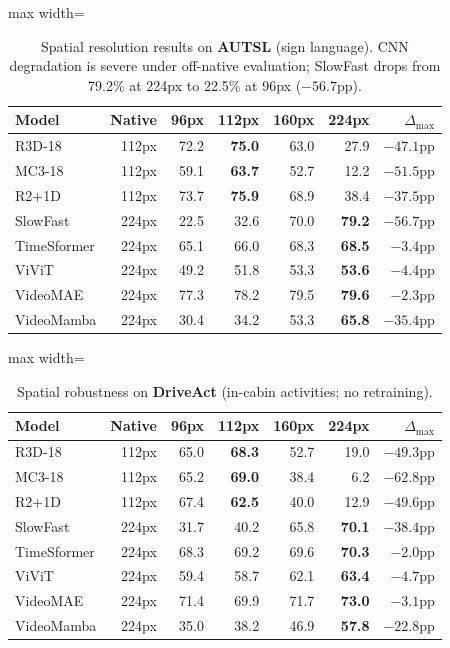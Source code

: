 \documentclass[a4paper, 10pt, conference, onecolumn]{ieeeconf}
\newcommand{\tabtight}{\setlength{\tabcolsep}{3.5pt}\renewcommand{\arraystretch}{1.12}}
\begin{document}
\begin{table}[!htbp]
\centering
\caption{Spatial resolution results on \textbf{AUTSL} (sign language). CNN degradation is severe under off-native evaluation; SlowFast drops from 79.2\% at 224px to 22.5\% at 96px ($-56.7$pp).}
\label{tab:sup_sp_autsl}
\scriptsize\tabtight
\begin{adjustbox}{max width=\textwidth}
\begin{tabular}{l r rrrr r}
\toprule
Model & Native & 96px & 112px & 160px & 224px & $\Delta_\text{max}$ \\
\midrule
R3D-18      & 112px & 72.2 & \textbf{75.0} & 63.0 & 27.9 & $-47.1$pp \\
MC3-18      & 112px & 59.1 & \textbf{63.7} & 52.7 & 12.2 & $-51.5$pp \\
R2+1D       & 112px & 73.7 & \textbf{75.9} & 68.9 & 38.4 & $-37.5$pp \\
SlowFast    & 224px & 22.5 & 32.6 & 70.0 & \textbf{79.2} & $-56.7$pp \\
\midrule
TimeSformer & 224px & 65.1 & 66.0 & 68.3 & \textbf{68.5} & $-3.4$pp \\
ViViT       & 224px & 49.2 & 51.8 & 53.3 & \textbf{53.6} & $-4.4$pp \\
VideoMAE    & 224px & 77.3 & 78.2 & 79.5 & \textbf{79.6} & $-2.3$pp \\
VideoMamba  & 224px & 30.4 & 34.2 & 53.3 & \textbf{65.8} & $-35.4$pp \\
\bottomrule
\end{tabular}
\end{adjustbox}
\end{table}

\begin{table}[!htbp]
\centering
\caption{Spatial robustness on \textbf{DriveAct} (in-cabin activities; no retraining).}
\label{tab:sup_sp_drive}
\scriptsize\tabtight
\begin{adjustbox}{max width=\textwidth}
\begin{tabular}{l r rrrr r}
\toprule
Model & Native & 96px & 112px & 160px & 224px & $\Delta_\text{max}$ \\
\midrule
R3D-18      & 112px & 65.0 & \textbf{68.3} & 52.7 & 19.0 & $-49.3$pp \\
MC3-18      & 112px & 65.2 & \textbf{69.0} & 38.4 &  6.2 & $-62.8$pp \\
R2+1D       & 112px & 67.4 & \textbf{62.5} & 40.0 & 12.9 & $-49.6$pp \\
SlowFast    & 224px & 31.7 & 40.2 & 65.8 & \textbf{70.1} & $-38.4$pp \\
\midrule
TimeSformer & 224px & 68.3 & 69.2 & 69.6 & \textbf{70.3} & $-2.0$pp \\
ViViT       & 224px & 59.4 & 58.7 & 62.1 & \textbf{63.4} & $-4.7$pp \\
VideoMAE    & 224px & 71.4 & 69.9 & 71.7 & \textbf{73.0} & $-3.1$pp \\
VideoMamba  & 224px & 35.0 & 38.2 & 46.9 & \textbf{57.8} & $-22.8$pp \\
\bottomrule
\end{tabular}
\end{adjustbox}
\end{table}
\end{document}

